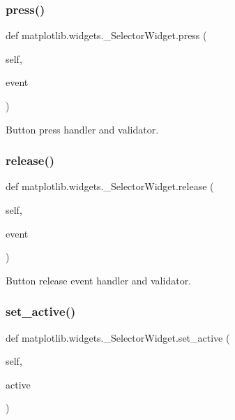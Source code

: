 \subsubsection{\texorpdfstring{press()}{press()}}
{\footnotesize\ttfamily def matplotlib.\+widgets.\+\_\+\+Selector\+Widget.\+press (\begin{DoxyParamCaption}\item[{}]{self,  }\item[{}]{event }\end{DoxyParamCaption})}

\begin{DoxyVerb}Button press handler and validator.\end{DoxyVerb}
 \mbox{\label{classmatplotlib_1_1widgets_1_1__SelectorWidget_a5fa061e6eb6ceb1657505b9c15917779}} 
\subsubsection{\texorpdfstring{release()}{release()}}
{\footnotesize\ttfamily def matplotlib.\+widgets.\+\_\+\+Selector\+Widget.\+release (\begin{DoxyParamCaption}\item[{}]{self,  }\item[{}]{event }\end{DoxyParamCaption})}

\begin{DoxyVerb}Button release event handler and validator.\end{DoxyVerb}
 \mbox{\label{classmatplotlib_1_1widgets_1_1__SelectorWidget_a5ded5af8e8d58455440314fb66f8981c}} 
\subsubsection{\texorpdfstring{set\+\_\+active()}{set\_active()}}
{\footnotesize\ttfamily def matplotlib.\+widgets.\+\_\+\+Selector\+Widget.\+set\+\_\+active (\begin{DoxyParamCaption}\item[{}]{self,  }\item[{}]{active }\end{DoxyParamCaption})}


